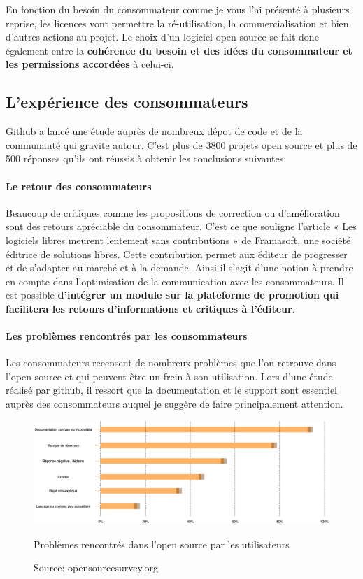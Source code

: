 			En fonction du besoin du consommateur comme je vous l'ai présenté à plusieurs reprise, les licences vont permettre la ré-utilisation, la commercialisation et bien d'autres actions au projet. Le choix d'un logiciel open source se fait donc également entre la \textbf{cohérence du besoin et des idées du consommateur et les permissions accordées} à celui-ci.

		\subsection{L'expérience des consommateurs}

			Github a lancé une étude auprès de nombreux dépot de code et de la communauté qui gravite autour. C'est plus de 3800 projets open source et plus de 500 réponses qu'ils ont réussis à obtenir les conclusions suivantes:

			\paragraph{Le retour des consommateurs \\}

				Beaucoup de critiques comme les propositions de correction ou d'amélioration sont des retours apréciable du consommateur. C'est ce que souligne l'article « Les logiciels libres meurent lentement sans contributions » de Framasoft, une société éditrice de solutions libres. 
				Cette contribution permet aux éditeur de progresser et de s'adapter au marché et à la demande.
				Ainsi il s'agit d'une notion à prendre en compte dans l'optimisation de la communication avec les consommateurs. Il est possible \textbf{d'intégrer un module sur la plateforme de promotion qui facilitera les retours d'informations et critiques à l'éditeur}. 

			\paragraph{Les problèmes rencontrés par les consommateurs\\}

				Les consommateurs recensent de nombreux problèmes que l'on retrouve dans l'open source et qui peuvent être un frein à son utilisation. Lors d'une étude réalisé par github, il ressort que la documentation et le support sont essentiel auprès des consommateurs auquel je suggère de faire principalement attention. 

				\begin{figure}[ht]
					\center
					\includegraphics[scale=0.50]{./img/pb_os.png}
					\caption{Problèmes rencontrés dans l'open source par les utilisateurs}
   					\caption*{\color{silver}Source: opensourcesurvey.org}
				\end{figure}
				\clearpage

